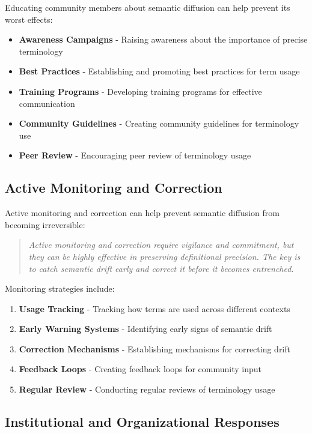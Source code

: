 \documentclass[11pt]{article}
\begin{document}
Educating community members about semantic diffusion can help prevent its worst effects:

\begin{itemize}
\item \textbf{Awareness Campaigns} - Raising awareness about the importance of precise terminology
\item \textbf{Best Practices} - Establishing and promoting best practices for term usage
\item \textbf{Training Programs} - Developing training programs for effective communication
\item \textbf{Community Guidelines} - Creating community guidelines for terminology use
\item \textbf{Peer Review} - Encouraging peer review of terminology usage
\end{itemize}

\subsection{Active Monitoring and Correction}

Active monitoring and correction can help prevent semantic diffusion from becoming irreversible:

\begin{quote}
\emph{Active monitoring and correction require vigilance and commitment, but they can be highly effective in preserving definitional precision. The key is to catch semantic drift early and correct it before it becomes entrenched.}
\end{quote}

Monitoring strategies include:

\begin{enumerate}
\item \textbf{Usage Tracking} - Tracking how terms are used across different contexts
\item \textbf{Early Warning Systems} - Identifying early signs of semantic drift
\item \textbf{Correction Mechanisms} - Establishing mechanisms for correcting drift
\item \textbf{Feedback Loops} - Creating feedback loops for community input
\item \textbf{Regular Review} - Conducting regular reviews of terminology usage
\end{enumerate}

\subsection{Institutional and Organizational Responses}
\end{document}
